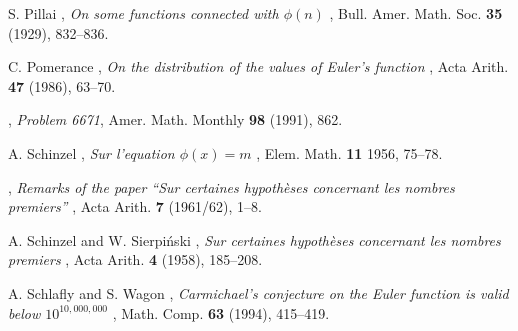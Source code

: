 \documentclass[11pt]{amsart}
\theoremstyle{remark}
\theoremstyle{plain}
\numberwithin{equation}{section}
\renewcommand{\(}{\left(}
\renewcommand{\)}{\right)}
\begin{document}
\begin{thebibliography}{EH38}
 S. Pillai , {\it  On some functions connected with
$\phi(n)$ },  Bull. Amer. Math. Soc. {\bf  35 } (1929), 832--836.

 C. Pomerance , {\it  On the distribution of the values 
of Euler's function },  Acta Arith. {\bf  47 } (1986), 63--70.


 \bysame , {\it  Problem 6671},  Amer. Math.
Monthly {\bf  98 } (1991),  862. 

 A. Schinzel , {\it  Sur l'equation $\phi(x)=m$
},  Elem. Math.  {\bf  11 } 1956, 75--78. 

 \bysame , {\it  Remarks of the paper ``Sur
certaines hypoth\`eses concernant les nombres premiers'' },  Acta Arith.
{\bf  7 } (1961/62), 1--8.


 A. Schinzel and W. Sierpi\'nski
, {\it  Sur certaines hypoth\`eses concernant les nombres premiers
},  Acta Arith. {\bf  4 } (1958), 185--208.


 A. Schlafly and S. Wagon , {\it  Carmichael's conjecture
on the Euler function is valid below $10^{10,000,000}$ },  Math. Comp.
{\bf  63 } (1994), 415--419. 

\end{thebibliography}
\end{document}
